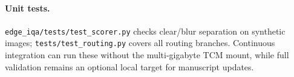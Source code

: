 \paragraph{Unit tests.}
\texttt{edge\_iqa/tests/test\_scorer.py} checks clear/blur separation on synthetic images; \texttt{tests/test\_routing.py} covers all routing branches.
Continuous integration can run these without the multi-gigabyte TCM mount, while full validation remains an optional local target for manuscript updates.
